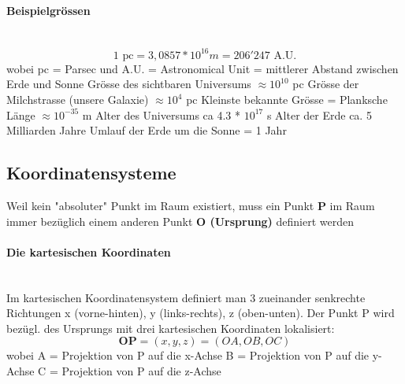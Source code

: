 \documentclass[7pt]{article}
\begin{document}
\begin{multicols*}{3}
\paragraph{Beispielgr{\"o}ssen}
\mbox{}\\ 
\begin{equation*}
	1  \text{ pc} = 3,0857*10^{16} m = 206'247 \text{ A.U.}
\end{equation*} 
wobei pc = Parsec und A.U. = Astronomical Unit = mittlerer Abstand zwischen Erde und Sonne
\newline
\newline Gr{\"o}sse des sichtbaren Universums $\approx 10^{10}$ pc 	
\newline Gr{\"o}sse der Milchstrasse (unsere Galaxie) $\approx 10^4$ pc
\newline Kleinste bekannte Gr{\"o}sse = Planksche L{\"a}nge $\approx 10^{-35}$ m
\newline
\newline Alter des Universums ca 4.3 * $10^{17}$ s
\newline Alter der Erde ca. 5 Milliarden Jahre
\newline Umlauf der Erde um die Sonne = 1 Jahr



\subsection{Koordinatensysteme}

Weil kein "absoluter" Punkt im Raum existiert, muss ein Punkt \textbf{P} im Raum immer bezüglich einem anderen Punkt \textbf{O (Ursprung)} definiert werden


\paragraph{Die kartesischen Koordinaten}

\mbox{}\\ Im kartesischen Koordinatensystem definiert man 3 zueinander senkrechte Richtungen x (vorne-hinten), y (links-rechts), z (oben-unten). Der Punkt P wird bezügl. des Ursprungs mit drei kartesischen Koordinaten lokalisiert:
\begin{equation*}
	\textbf{OP} = (x,y,z) = (OA, OB, OC)
\end{equation*}
wobei A = Projektion von P auf die x-Achse
\newline B = Projektion von P auf die y-Achse
\newline C = Projektion von P auf die z-Achse



\end{multicols*}
\end{document}
